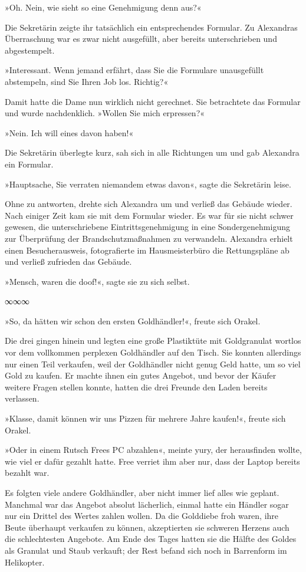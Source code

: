 »Oh. Nein, wie sieht so eine Genehmigung denn aus?«

Die Sekretärin zeigte ihr tatsächlich ein entsprechendes Formular. Zu Alexandras Überraschung war es zwar nicht ausgefüllt, aber bereits unterschrieben und abgestempelt.

»Interessant. Wenn jemand erfährt, dass Sie die Formulare unausgefüllt abstempeln, sind Sie Ihren Job los. Richtig?«

Damit hatte die Dame nun wirklich nicht gerechnet. Sie betrachtete das Formular und wurde nachdenklich. »Wollen Sie mich erpressen?«

»Nein. Ich will eines davon haben!«

Die Sekretärin überlegte kurz, sah sich in alle Richtungen um und gab Alexandra ein Formular.

»Hauptsache, Sie verraten niemandem etwas davon«, sagte die Sekretärin leise.

Ohne zu antworten, drehte sich Alexandra um und verließ das Gebäude wieder. Nach einiger Zeit kam sie mit dem Formular wieder. Es war für sie nicht schwer gewesen, die unterschriebene Eintrittsgenehmigung in eine Sondergenehmigung zur Überprüfung der Brandschutzmaßnahmen zu verwandeln. Alexandra erhielt einen Besucherausweis, fotografierte im Hausmeisterbüro die Rettungspläne ab und verließ zufrieden das Gebäude.

»Mensch, waren die doof!«, sagte sie zu sich selbst.

\begin{center}
    ∞∞∞
\end{center}

»So, da hätten wir schon den ersten Goldhändler!«, freute sich Orakel.

Die drei gingen hinein und legten eine große Plastiktüte mit Goldgranulat wortlos vor dem vollkommen perplexen Goldhändler auf den Tisch. Sie konnten allerdings nur einen Teil verkaufen, weil der Goldhändler nicht genug Geld hatte, um so viel Gold zu kaufen. Er machte ihnen ein gutes Angebot, und bevor der Käufer weitere Fragen stellen konnte, hatten die drei Freunde den Laden bereits verlassen.

»Klasse, damit können wir uns Pizzen für mehrere Jahre kaufen!«, freute sich Orakel.

»Oder in einem Rutsch Frees PC abzahlen«, meinte yury, der herausfinden wollte, wie viel er dafür gezahlt hatte. Free verriet ihm aber nur, dass der Laptop bereits bezahlt war.

Es folgten viele andere Goldhändler, aber nicht immer lief alles wie geplant. Manchmal war das Angebot absolut lächerlich, einmal hatte ein Händler sogar nur ein Drittel des Wertes zahlen wollen. Da die Golddiebe froh waren, ihre Beute überhaupt verkaufen zu können, akzeptierten sie schweren Herzens auch die schlechtesten Angebote. Am Ende des Tages hatten sie die Hälfte des Goldes als Granulat und Staub verkauft; der Rest befand sich noch in Barrenform im Helikopter.

